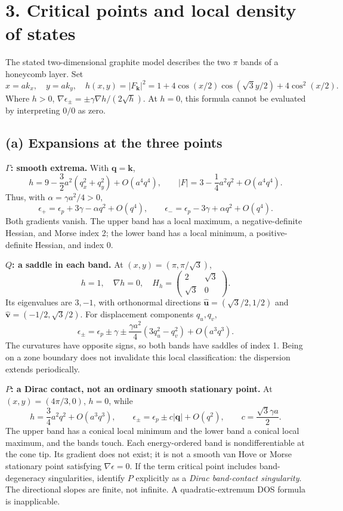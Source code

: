\section*{3. Critical points and local density of states}
The stated two-dimensional graphite model describes the two $\pi$ bands of a honeycomb layer. Set
\[
x=ak_x,\quad y=ak_y,\quad
h(x,y)=|F_{\mathbf k}|^2
=1+4\cos(x/2)\cos(\sqrt3y/2)+4\cos^2(x/2).
\]
Where $h>0$, $\nabla\epsilon_\pm=\pm\gamma\nabla h/(2\sqrt h)$. At $h=0$, this formula cannot be evaluated by interpreting $0/0$ as zero.

\subsection*{(a) Expansions at the three points}
\textbf{$\Gamma$: smooth extrema.} With $\mathbf q=\mathbf k$,
\[
h=9-\frac32a^2(q_x^2+q_y^2)+O(a^4q^4),\qquad
|F|=3-\frac14a^2q^2+O(a^4q^4).
\]
Thus, with $\alpha=\gamma a^2/4>0$,
\[
\epsilon_+=\epsilon_p+3\gamma-\alpha q^2+O(q^4),\qquad
\epsilon_-=\epsilon_p-3\gamma+\alpha q^2+O(q^4).
\]
Both gradients vanish. The upper band has a local maximum, a negative-definite Hessian, and Morse index 2; the lower band has a local minimum, a positive-definite Hessian, and index 0.

\textbf{$Q$: a saddle in each band.} At $(x,y)=(\pi,\pi/\sqrt3)$,
\[
h=1,\quad \nabla h=0,\quad
H_h=\begin{pmatrix}2&\sqrt3\\ \sqrt3&0\end{pmatrix}.
\]
Its eigenvalues are $3,-1$, with orthonormal directions
$\hat{\mathbf u}=(\sqrt3/2,1/2)$ and $\hat{\mathbf v}=(-1/2,\sqrt3/2)$.
For displacement components $q_u,q_v$,
\[
\epsilon_\pm=\epsilon_p\pm\gamma
\pm\frac{\gamma a^2}{4}(3q_u^2-q_v^2)+O(a^3q^3).
\]
The curvatures have opposite signs, so both bands have saddles of index 1. Being on a zone boundary does not invalidate this local classification: the dispersion extends periodically.

\textbf{$P$: a Dirac contact, not an ordinary smooth stationary point.}
At $(x,y)=(4\pi/3,0)$, $h=0$, while
\[
h=\frac34a^2q^2+O(a^3q^3),\qquad
\epsilon_\pm=\epsilon_p\pm c|\mathbf q|+O(q^2),\qquad
c=\frac{\sqrt3\gamma a}{2}.
\]
The upper band has a conical local minimum and the lower band a conical local maximum, and the bands touch. Each energy-ordered band is nondifferentiable at the cone tip. Its gradient does not exist; it is not a smooth van Hove or Morse stationary point satisfying $\nabla\epsilon=0$. If the term critical point includes band-degeneracy singularities, identify $P$ explicitly as a \emph{Dirac band-contact singularity}. The directional slopes are finite, not infinite. A quadratic-extremum DOS formula is inapplicable.

